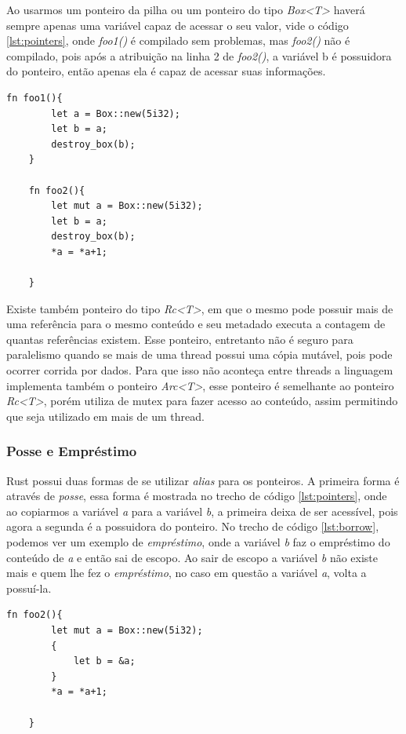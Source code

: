 \documentclass[rel_mlp]{iiufrgs}
\begin{document}
Ao usarmos um ponteiro da pilha ou um ponteiro do tipo \textit{Box<T>} haverá sempre apenas uma variável capaz de acessar o seu valor, vide o código \ref{lst:pointers}, onde \textit{foo1()} é compilado sem problemas, mas \textit{foo2()} não é compilado, pois após a atribuição na linha 2 de \textit{foo2()}, a variável b é possuidora do ponteiro, então apenas ela é capaz de acessar suas informações.

 
 
 \begin{lstlisting}[frame=single, label={lst:pointers}, caption={Exemplos de ponteiros}]
    fn foo1(){
        let a = Box::new(5i32);
        let b = a;
        destroy_box(b);
    }
    
    fn foo2(){
        let mut a = Box::new(5i32);
        let b = a;
        destroy_box(b);
        *a = *a+1;
    
    }
 \end{lstlisting}
Existe também ponteiro do tipo \textit{Rc<T>}, em que o mesmo pode possuir mais de uma referência para o mesmo conteúdo e seu metadado executa a contagem de quantas referências existem. Esse ponteiro, entretanto não é seguro para paralelismo quando se mais de uma thread possui uma cópia mutável, pois pode ocorrer corrida por dados. Para que isso não aconteça entre threads a linguagem implementa também o ponteiro \textit{Arc<T>}, esse ponteiro é semelhante ao ponteiro \textit{Rc<T>}, porém utiliza de mutex para fazer acesso ao conteúdo, assim permitindo que seja utilizado em mais de um thread.

\subsubsection{Posse e Empréstimo}
Rust possui duas formas de se utilizar \textit{alias} para os ponteiros. A primeira forma é através de \textit{posse}, essa forma é mostrada no trecho de código \ref{lst:pointers}, onde ao copiarmos a variável \textit{a} para a variável \textit{b}, a primeira deixa de ser acessível, pois agora a segunda é a possuidora do ponteiro. No trecho de código \ref{lst:borrow}, podemos ver um exemplo de \textit{empréstimo}, onde a variável \textit{b} faz o empréstimo do conteúdo de \textit{a} e então sai de escopo. Ao sair de escopo a variável \textit{b} não existe mais e quem lhe fez o \textit{empréstimo}, no caso em questão a variável \textit{a}, volta a possuí-la.


\begin{lstlisting}[frame = single, label ={lst:borrow}, caption = {Exemplo de Empréstimo}]
    fn foo2(){
        let mut a = Box::new(5i32);
        {
            let b = &a;
        }
        *a = *a+1;
    
    }
\end{lstlisting}
\end{document}
